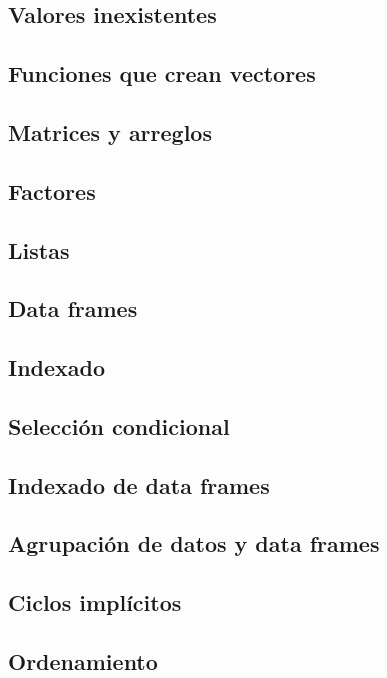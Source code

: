 \documentclass[spanish]{extbook}
\numberwithin{equation}{section}
\numberwithin{figure}{section}
\begin{document}
\subsection{Valores inexistentes}
\subsection{Funciones que crean vectores}
\subsection{Matrices y arreglos}
\subsection{Factores}
\subsection{Listas}
\subsection{Data frames}
\subsection{Indexado}
\subsection{Selección condicional}
\subsection{Indexado de data frames}
\subsection{Agrupación de datos y data frames}
\subsection{Ciclos implícitos}
\subsection{Ordenamiento}
\end{document}
